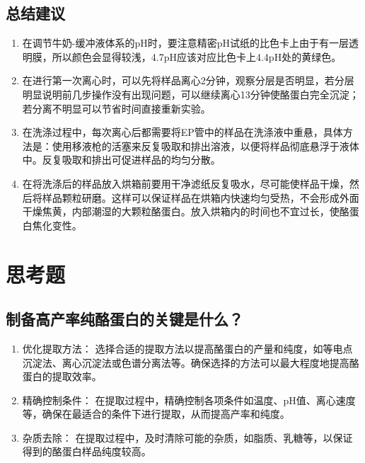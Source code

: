 \documentclass[UTF8]{ctexart}
\begin{document}
\subsection{总结建议}
\begin{enumerate}
    \item 在调节牛奶-缓冲液体系的pH时，要注意精密pH试纸的比色卡上由于有一层透明膜，所以颜色会显得较浅，4.7pH应该对应比色卡上4.4pH处的黄绿色。
    \item 在进行第一次离心时，可以先将样品离心2分钟，观察分层是否明显，若分层明显说明前几步操作没有出现问题，可以继续离心13分钟使酪蛋白完全沉淀；若分离不明显可以节省时间直接重新实验。
    \item 在洗涤过程中，每次离心后都需要将EP管中的样品在洗涤液中重悬，具体方法是：使用移液枪的活塞来反复吸取和排出溶液，以便将样品彻底悬浮于液体中。反复吸取和排出可促进样品的均匀分散。
    \item 在将洗涤后的样品放入烘箱前要用干净滤纸反复吸水，尽可能使样品干燥，然后将样品颗粒研磨。这样可以保证样品在烘箱内快速均匀受热，不会形成外面干燥焦黄，内部潮湿的大颗粒酪蛋白。放入烘箱内的时间也不宜过长，使酪蛋白焦化变性。
\end{enumerate}
\section{思考题}
\subsection{制备高产率纯酪蛋白的关键是什么？}
\begin{enumerate}
    \item 优化提取方法： 选择合适的提取方法以提高酪蛋白的产量和纯度，如等电点沉淀法、离心沉淀法或色谱分离法等。确保选择的方法可以最大程度地提高酪蛋白的提取效率。
    \item 精确控制条件： 在提取过程中，精确控制各项条件如温度、pH值、离心速度等，确保在最适合的条件下进行提取，从而提高产率和纯度。
    \item 杂质去除： 在提取过程中，及时清除可能的杂质，如脂质、乳糖等，以保证得到的酪蛋白样品纯度较高。
\end{enumerate}
\end{document}
